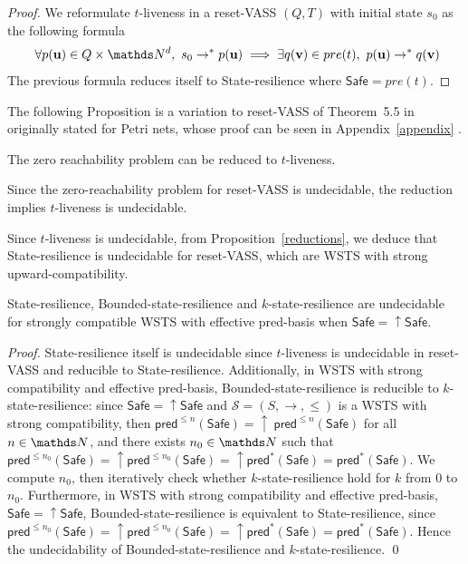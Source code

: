 \documentclass[runningheads]{llncs}
\newcommand{\pred}{\textsf{pred}}
\newcommand{\Safe}{\textsf{Safe}}
\begin{document}
\begin{proof}
We reformulate $t$-liveness 
in a 
reset-VASS $(Q,T)$ 
with initial state $s_0$
as the following formula
\[ ~ \forall p(\textbf{u}) \in Q \times \N^d, 
~ s_0 \rightarrow^* p(\textbf{u}) \implies \exists q(\textbf{v}) \in pre(t), ~ p(\textbf{u}) \rightarrow^{*} q(\textbf{v})\]  
The previous formula reduces itself to {\sc State-resilience}
where $\Safe = pre(t)$.
\end{proof}


The following Proposition is a variation  to reset-VASS of Theorem~5.5 in \cite{peterson1981petri} originally stated for Petri nets, whose proof can be seen in Appendix~\ref{appendix}%
.
\begin{proposition}\label{liveness reset}
The  zero reachability problem can be reduced to {\sc $t$-liveness}.
\end{proposition}



Since the zero-reachability problem for reset-VASS is undecidable, the reduction implies 
{\sc $t$-liveness} is undecidable.

Since {\sc $t$-liveness} is undecidable, from Proposition~\ref{reductions},  we deduce that {\sc State-resilience} is undecidable  for reset-VASS, which are WSTS with strong upward-compatibility. 


\begin{theorem}\label{srp up down}
{\sc State-resilience},
{\sc Bounded-state-resilience} and
{\sc $k$-state-resilience}
are undecidable for strongly compatible WSTS with effective pred-basis
when
$\Safe=\uparrow \Safe$.
\end{theorem}


\begin{proof}
{\sc State-resilience} itself is undecidable 
since 
{\sc $t$-liveness} is undecidable in reset-VASS
and reducible to {\sc State-resilience}.
Additionally, in WSTS with strong compatibility and effective pred-basis, {\sc Bounded-state-resilience} is
reducible to {\sc $k$-state-resilience}:
since $\Safe=\uparrow \Safe$ and
$\mathscr{S}=(S,\rightarrow,\leq)$ is a WSTS with strong 
compatibility, then $\pred^{\leq n}(\Safe)= \uparrow~\pred^{\leq n}(\Safe)$ for all $n \in \N$,
and there exists $n_0 \in \N$ such that 
$\pred^{\leq n_0}(\Safe) = \uparrow \pred^{\leq n_0}(\Safe) = \uparrow \pred^*(\Safe) = \pred^*(\Safe)$.
We compute 
$n_0$, then iteratively check whether $k$-state-resilience 
hold for $k$ from $0$ to $n_0$.  
Furthermore, in WSTS with strong compatibility and effective pred-basis,  $\Safe=\uparrow \Safe$, {\sc Bounded-state-resilience} is equivalent to {\sc State-resilience},
since 
$\pred^{\leq n_0}(\Safe) = \uparrow \pred^{\leq n_0}(\Safe) = {\uparrow \pred^*(\Safe)} = \pred^*(\Safe)$.
Hence the undecidability of {\sc Bounded-state-resilience}
and 
 {\sc $k$-state-resilience}. \qed
\end{proof}
\end{document}

